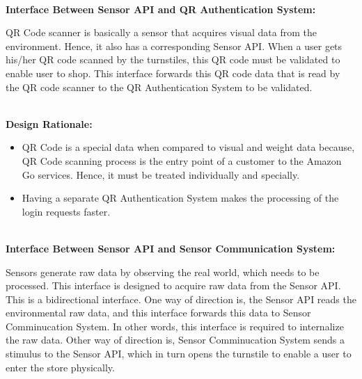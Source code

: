 \documentclass[11pt]{article}
\newcounter{subsubsubsection}[subsubsection]
\begin{document}

    \textbf{\\Interface Between Sensor API and QR Authentication System:\\}

    QR Code scanner is basically a sensor that acquires visual data from the environment. Hence, it also has a corresponding Sensor API. When a user gets his/her QR code scanned by the turnstiles,
    this QR code must be validated to enable user to shop. This interface forwards this QR code data that is read by the QR code scanner to the QR Authentication System to be validated. 
    
    \textbf{\\Design Rationale:}
    \begin{itemize}
      \item QR Code is a special data when compared to visual and weight data because, QR Code scanning process is the entry point of a customer to the Amazon Go services. 
      Hence, it must be treated individually and specially. 
      \item Having a separate QR Authentication System makes the processing of the login requests faster. 
    \end{itemize}

    \textbf{\\Interface Between Sensor API and Sensor Communication System:\\}
    
    Sensors generate raw data by observing the real world, which needs to be processed. This interface is designed to acquire raw data from the Sensor API. This is a bidirectional interface. 
    One way of direction is, the Sensor API reads the environmental raw data, and this interface forwards this data to Sensor Comminucation System. 
    In other words, this interface is required to internalize the raw data.
    Other way of direction is, Sensor Comminucation System sends a stimulus to the Sensor API, which in turn opens the turnstile to enable a user to enter the store physically.
\end{document}
